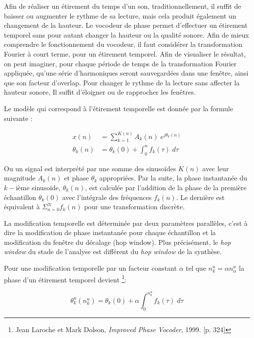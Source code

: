 Afin de réaliser un étirement du temps d'un son, traditionnellement, il suffit de baisser ou augmenter le rythme de sa lecture, mais cela produit également un changement de la hauteur. Le vocodeur de phase permet d'effectuer un étirement temporel sans pour autant changer la hauteur ou la qualité sonore. Afin de mieux comprendre le fonctionnement du vocodeur, il faut considérer la transformation Fourier à court terme, pour un étirement temporel. Afin de visualiser le résultat, on peut imaginer, pour chaque période de temps de la transformation Fourier appliquée, qu'une série d'harmoniques seront sauvegardées dans une fenêtre, ainsi que son facteur d'overlap. Pour changer le rythme de la lecture sans affecter la hauteur sonore, Il suffit d'éloigner ou de rapprocher les fenêtres.

Le modèle qui correspond à l'étirement temporelle est donnée par la formule suivante :

    \begin{align}
         x(n) &= \sum_{k=1}^{K(n)} A_k(n) \; e^{j \theta_k (n)} \\
         \theta_k(n) &= \theta_k(0) + \int_{0}^{n} f_k (\tau) \; d\tau
    \end{align}

Ou un signal est interprété par une somme des sinusoïdes $K(n)$ avec leur magnitude $A_k(n)$ et phase $\theta_k$ appropriées. Par la suite, la phase instantanée du $k-$ième sinusoïde, $\theta_k(n)$, est calculée par l'addition de la phase de la première échantillon $\theta_k(0)$ avec l'intégrale des fréquences $f_k (n)$. Le dernière est équivalent à $\Sigma_{n=0}^N f_k(n)$ pour une transformation discrète.

La modification temporelle est déterminée par deux paramètres parallèles, c’est à dire la modification de phase instantanée pour chaque échantillon et la modification du fenêtre du décalage (hop window). Plus précisément, le \textit{hop window} du stade de l'analyse est différent du \textit{hop window} de la synthèse.

Pour une modification temporelle par un facteur constant $\alpha$ tel que $n_k^u = \alpha n_\alpha^u$ la phase d'un étirement temporel devient \footnote{Jean Laroche et Mark Dolson, \textit{Improved Phase Vocoder}, 1999. [p. 324] \nocite{DoLa99}}:
    
    \begin{equation}
        \theta_k^u(n_k^u) = \theta_k(0) + \alpha \int_0^{n_k^u}  f_k (\tau) \; d\tau
    \end{equation}

